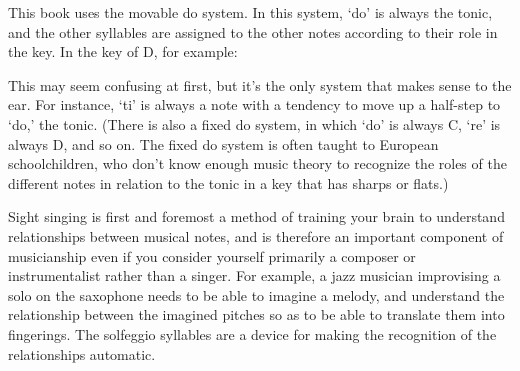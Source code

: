 \documentclass{sight}
\begin{document}
\pagebreak[3]\par
\vspace{5mm}\begin{samepage}This book uses the movable do system. In this system, `do' is always the tonic, and the other syllables are assigned to the other notes according to their role in the key. In the key of D, for example:\\


\pagebreak[3]\par
\par
{%
\parindent 0pt
\noindent
\ifx\preLilyPondExample \undefined
\else
  \expandafter\preLilyPondExample
\fi
\def\lilypondbook{}%

\ifx\postLilyPondExample \undefined
\else
  \expandafter\postLilyPondExample
\fi
}
\end{samepage}


\pagebreak[3]\par
\vspace{5mm}\begin{samepage}This may seem confusing at first, but it's the only system that makes sense to the ear. For instance, `ti' is always a note with a tendency to move up a half-step to `do,' the tonic. (There is also a fixed do system, in which `do' is always C, `re' is always D, and so on. The fixed do system is often taught to European schoolchildren, who don't know enough music theory to recognize the roles of the different notes in relation to the tonic in a key that has sharps or flats.)\\
\end{samepage}


\pagebreak[3]\par
\vspace{5mm}\begin{samepage}Sight singing is first and foremost a method of training your brain to understand relationships between musical notes, and is therefore an important component of musicianship even if you consider yourself primarily a composer or instrumentalist rather than a singer. For example, a jazz musician improvising a solo on the saxophone needs to be able to imagine a melody, and understand the relationship between the imagined pitches so as to be able to translate them into fingerings. The solfeggio syllables are a device for making the recognition of the relationships automatic.\\
\end{samepage}
\end{document}
